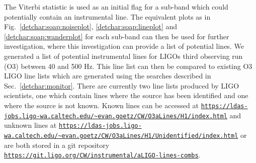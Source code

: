\clearpage

The Viterbi statistic is used as an initial flag for a sub-band which could potentially contain an instrumental line.
The equivalent plots as in Fig.~\ref{detchar:soap:noiseplot}, \ref{detchar:soap:lineplot} and
\ref{detchar:soap:wanderplot} for each sub-band can then be used for further investigation, where this investigation can provide a list of potential lines. 
We generated a list of potential instrumental lines for \glspl{LIGO} third observing run (O3) between 40 and 500 Hz.
This line list can then be compared to existing O3 \gls{LIGO} line lists which are generated using the searches described in Sec.~\ref{detchar:monitor}.
There are currently two line lists produced by \gls{LIGO} scientists, one which contain lines where the source has been identified and one where the source is not known.
Known lines can be accessed at {\tt \url{https://ldas-jobs.ligo-wa.caltech.edu/~evan.goetz/CW/O3aLines/H1/index.html}}
and unknown lines at {\tt \url{https://ldas-jobs.ligo-wa.caltech.edu/~evan.goetz/CW/O3aLines/H1/Unidentified/index.html}} or are both stored in a git repository {\tt \url{https://git.ligo.org/CW/instrumental/aLIGO-lines-combs}}. 

